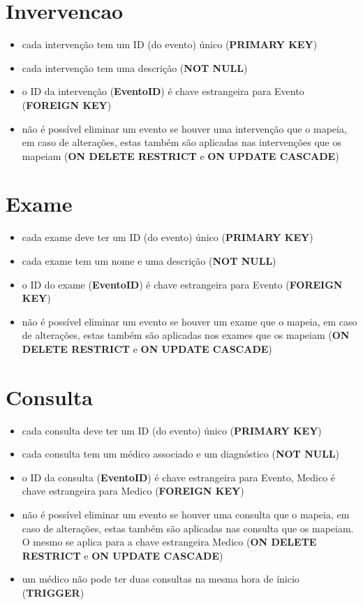 \documentclass[article, a4paper, 12pt, oneside]{memoir}
\begin{document}
\newpage

\section*{Invervencao}
\begin{itemize}
	\item cada intervenção tem um ID (do evento) único (\textbf{PRIMARY KEY})
	\item cada intervenção tem uma descrição (\textbf{NOT NULL})
	\item o ID da intervenção (\textbf{EventoID}) é chave estrangeira para Evento (\textbf{FOREIGN KEY})
	\item não é possível eliminar um evento se houver uma intervenção que o mapeia, em caso de alterações, estas também são aplicadas nas intervenções que os mapeiam (\textbf{ON DELETE RESTRICT} e \textbf{ON UPDATE CASCADE})
\end{itemize}

\section*{Exame}
\begin{itemize}
	\item cada exame deve ter um ID (do evento) único (\textbf{PRIMARY KEY})
	\item cada exame tem um nome e uma descrição (\textbf{NOT NULL})
	\item o ID do exame (\textbf{EventoID}) é chave estrangeira para Evento (\textbf{FOREIGN KEY})
	\item não é possível eliminar um evento se houver um exame que o mapeia, em caso de alterações, estas também são aplicadas nos exames que os mapeiam (\textbf{ON DELETE RESTRICT} e \textbf{ON UPDATE CASCADE})
\end{itemize}

\section*{Consulta}
\begin{itemize}
	\item cada consulta deve ter um ID (do evento) único (\textbf{PRIMARY KEY})
	\item cada consulta tem um médico associado e um diagnóstico (\textbf{NOT NULL})
	\item o ID da consulta (\textbf{EventoID}) é chave estrangeira para Evento, Medico é chave estrangeira para Medico (\textbf{FOREIGN KEY})
	\item não é possível eliminar um evento se houver uma consulta que o mapeia, em caso de alterações, estas também são aplicadas nas consulta que os mapeiam. O mesmo se aplica para a chave estrangeira Medico (\textbf{ON DELETE RESTRICT} e \textbf{ON UPDATE CASCADE})
	\item um médico não pode ter duas consultas na mesma hora de ínicio (\textbf{TRIGGER})
\end{itemize}
\end{document}
